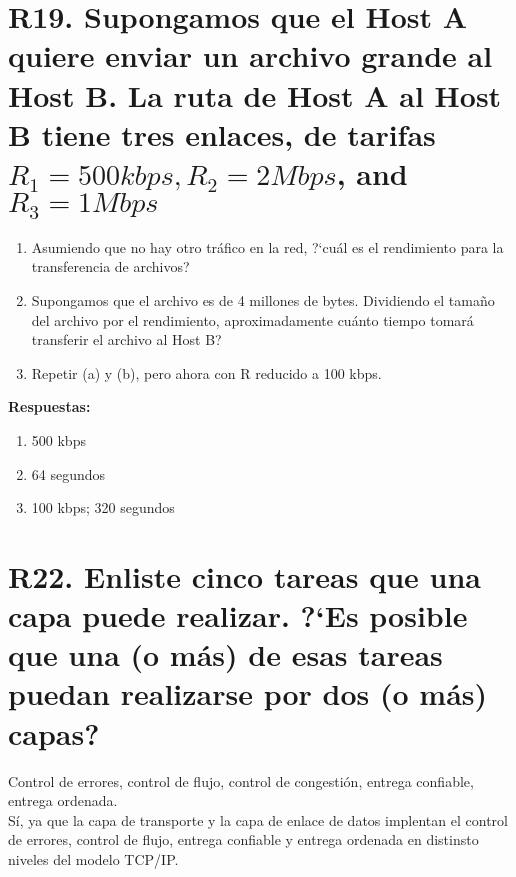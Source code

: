 \documentclass[a4paper, 11pt]{article}
\theoremstyle{definition} \theoremstyle{remark}
\begin{document}
     \section{R19. Supongamos que el Host A quiere enviar un archivo grande al Host B. La ruta de Host A al Host B tiene tres enlaces, de tarifas $R_{1}=500 kbps, R_{2}=2 Mbps$, and $R_{3}=1 Mbps$}
     \begin{enumerate}
       \item Asumiendo que no hay otro tr\'afico en la red, ?`cu\'al es el rendimiento para la transferencia de archivos?
       \item Supongamos que el archivo es de 4 millones de bytes. Dividiendo el tama\~{n}o del archivo por el rendimiento, aproximadamente cuánto tiempo tomar\'a transferir el archivo al Host B?
       \item Repetir (a) y (b), pero ahora con R reducido a 100 kbps.
     \end{enumerate}
     \textbf{Respuestas:}
     \begin{enumerate}
       \item 500 kbps
       \item 64 segundos
       \item 100 kbps; 320 segundos
     \end{enumerate}

     \section{R22. Enliste cinco tareas que una capa puede realizar. ?`Es posible que una (o m\'as) de esas tareas puedan realizarse por dos (o m\'as) capas? }
     Control de errores, control de flujo, control de congesti\'on, entrega confiable, entrega ordenada. \\
     S\'i, ya que la capa de transporte y la capa de enlace de datos implentan el control de errores, control de flujo, entrega confiable y entrega ordenada en distinsto niveles del modelo TCP/IP.
\end{document}
